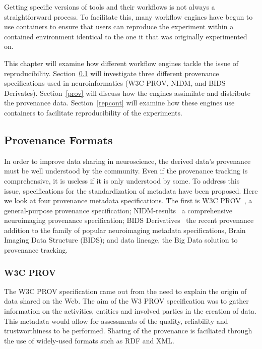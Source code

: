         Getting specific versions of tools and their workflows is not always 
        a straightforward process. To facilitate this, many workflow engines
        have begun to use containers to ensure that users can reproduce the 
        experiment within a contained environment identical to the one it that
        was originally experimented on. 

        This chapter will examine how different workflow engines tackle the 
        issue of reproducibility. Section~\ref{metadata} will investigate three 
        different provenance specifications used in neuroinformatics (W3C PROV, NIDM,
        and BIDS Derivates). Section~\ref{prov} will discuss how the 
        engines assimilate and distribute the provenance data. 
        Section~\ref{repcont} will examine how these engines use containers to
        facilitate reproducibility of the experiments.
        \subsection{Provenance Formats}\label{metadata}
            In order to improve data sharing in 
            neuroscience, the derived data's provenance must be well understood
            by the community. Even if the provenance tracking is comprehensive,
            it is useless if it is only understood by some. To address this 
            issue, specifications for the standardization of metadata have been 
            proposed. Here we look at four provenance metadata specifications.
            The first is W3C PROV~\cite{missier2013w3c}, a general-purpose provenance specification; 
            NIDM-results~\cite{Maumet:2016aa}
            a comprehensive neuroimaging provenance specification; BIDS 
            Derivatives~\cite{bidsderiv} the recent provenance addition to the family of 
            popular neuroimaging metadata specifications, Brain Imaging Data Structure (BIDS); 
            and data lineage, the Big Data solution to provenance tracking.

            \subsubsection{W3C PROV}
            The W3C PROV specification came out from the need to explain the 
            origin of data shared on the Web. 
            The aim of the W3 PROV specification was to gather information on
            the activities, entities and involved parties in the creation of 
            data. This metadata would allow for assessments of the quality, 
            reliability and trustworthiness to be performed. Sharing of the 
            provenance is faciliated through the use of widely-used formats 
            such as RDF and XML. 

